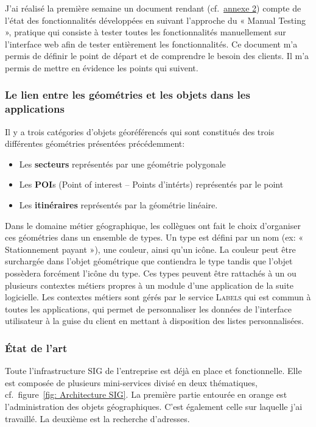 \documentclass{rapportUHA40}
\begin{document}
J’ai réalisé la première semaine un document rendant (cf.\
\hyperlink{ANNEX2}{annexe 2}) compte de l’état des fonctionnalités développées
en suivant l’approche du « Manual Testing », pratique qui consiste à tester
toutes les fonctionnalités manuellement sur l’interface web afin de tester
entièrement les fonctionnalités. Ce document m’a permis de définir le point de
départ et de comprendre le besoin des clients. Il m'a permis de mettre en
évidence les points qui suivent.

\subsubsection{Le lien entre les géométries et les objets dans les applications}
Il y a trois catégories d'objets géoréférencés qui sont constitués des trois
différentes géométries présentées précédemment:
\begin{itemize}
  \item Les \textbf{secteurs} représentés par une géométrie polygonale
  \item Les \textbf{POI}s (Point of interest – Points d'intérts) représentés par le
        point
  \item Les \textbf{itinéraires} représentés par la géométrie linéaire. \\
\end{itemize}

Dans le domaine métier géographique, les collègues ont fait le choix
d'organiser ces géométries dans un ensemble de types. Un type est défini par un
nom (ex: « Stationnement payant »), une couleur, ainsi qu'un icône. La couleur
peut être surchargée dans l'objet géométrique que contiendra le type tandis que
l'objet possèdera forcément l'icône du type. Ces types peuvent être rattachés à
un ou plusieurs contextes métiers propres à un module d'une application de la
suite logicielle. Les contextes métiers sont gérés par le service
\textsc{Labels} qui est commun à toutes les applications, qui permet de
personnaliser les données de l'interface utilisateur à la guise du client en
mettant à disposition des listes personnalisées.

\subsubsection{État de l'art}
Toute l'infrastructure SIG de l'entreprise est déjà en place et fonctionnelle.
Elle est composée de plusieurs mini-services divisé en deux thématiques, cf.\
figure~\ref{fig: Architecture SIG}. La première partie entourée en orange est
l'administration des objets géographiques. C'est également celle sur laquelle
j'ai travaillé. La deuxième est la recherche d'adresses.
\end{document}
